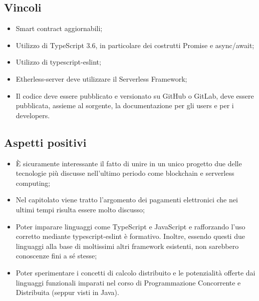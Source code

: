 \subsection{Vincoli}
\begin{itemize}
\item Smart contract aggiornabili;
\item Utilizzo di TypeScript 3.6, in particolare dei costrutti Promise e async/await;
\item Utilizzo di typescript-eslint;
\item Etherless-server deve utilizzare il Serverless Framework;
\item Il codice deve essere pubblicato e versionato su GitHub o GitLab, deve essere pubblicata, assieme al sorgente, la documentazione per gli users e per i developers.
\end{itemize}

\subsection{Aspetti positivi}
\begin{itemize}
\item È sicuramente interessante il fatto di unire in un unico progetto due delle tecnologie più discusse nell'ultimo periodo come blockchain e serverless computing;
\item Nel capitolato viene tratto l'argomento dei pagamenti elettronici che nei ultimi tempi risulta essere molto discusso;
\item Poter imparare linguaggi come TypeScript e JavaScript e rafforzando l'uso corretto mediante typescript-eslint \`e formativo. Inoltre, essendo questi due linguaggi alla base di moltissimi altri framework esistenti, non sarebbero conoscenze fini a sé stesse;
\item Poter sperimentare i concetti di calcolo distribuito e le potenzialità offerte dai linguaggi funzionali imparati nel corso di Programmazione Concorrente e Distribuita (seppur visti in Java).
\end{itemize}

